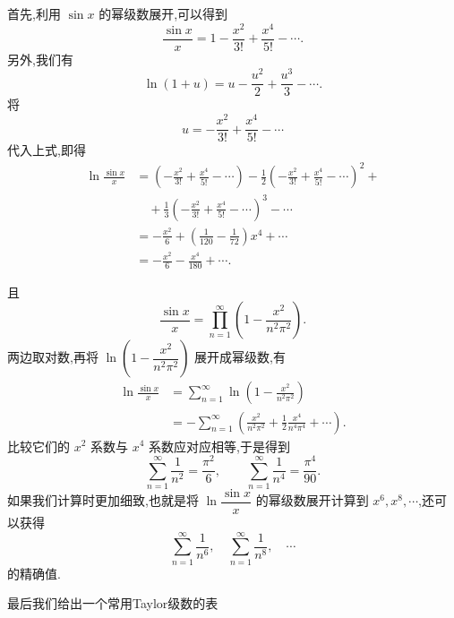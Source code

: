 \begin{solution}
	首先,利用 $\sin x$ 的幂级数展开,可以得到
	\[
	\frac{\sin x}{x}=1-\frac{x^2}{3!}+\frac{x^4}{5!}-\cdots .
	\]
	另外,我们有
	\[
	\ln(1+u)=u-\frac{u^2}{2}+\frac{u^3}{3}-\cdots .
	\]
	将
	\[
	u=-\frac{x^2}{3!}+\frac{x^4}{5!}-\cdots
	\]
	代入上式,即得
	\[
	\begin{aligned}
		\ln\frac{\sin x}{x}
		&=\left(-\frac{x^2}{3!}+\frac{x^4}{5!}-\cdots\right)
		-\frac{1}{2}\left(-\frac{x^2}{3!}+\frac{x^4}{5!}-\cdots\right)^2+\\
		&\quad+\frac{1}{3}\left(-\frac{x^2}{3!}+\frac{x^4}{5!}-\cdots\right)^3-\cdots\\
		&=-\frac{x^2}{6}+\left(\frac{1}{120}-\frac{1}{72}\right)x^4+\cdots\\
		&=-\frac{x^2}{6}-\frac{x^4}{180}+\cdots .
	\end{aligned}
	\]
	
且
	\[
	\frac{\sin x}{x}=\prod_{n=1}^{\infty}\left(1-\frac{x^2}{n^2\pi^2}\right).
	\]
	两边取对数,再将 $\ln\left(1-\dfrac{x^2}{n^2\pi^2}\right)$ 展开成幂级数,有
	\[
	\begin{aligned}
		\ln\frac{\sin x}{x}
		&=\sum_{n=1}^{\infty}\ln\left(1-\frac{x^2}{n^2\pi^2}\right)\\
		&=-\sum_{n=1}^{\infty}\left(\frac{x^2}{n^2\pi^2}+\frac{1}{2}\frac{x^4}{n^4\pi^4}+\cdots\right).
	\end{aligned}
	\]
	比较它们的 $x^2$ 系数与 $x^4$ 系数应对应相等,于是得到
	\[
	\sum_{n=1}^{\infty}\frac{1}{n^2}=\frac{\pi^2}{6},
	\qquad
	\sum_{n=1}^{\infty}\frac{1}{n^4}=\frac{\pi^4}{90}.
	\]
	如果我们计算时更加细致,也就是将 $\ln\dfrac{\sin x}{x}$ 的幂级数展开计算到 $x^6,x^8,\cdots$,还可以获得
	\[
	\sum_{n=1}^{\infty}\frac{1}{n^6},
	\quad
	\sum_{n=1}^{\infty}\frac{1}{n^8},
	\quad\cdots
	\]
	的精确值.
\end{solution}
最后我们给出一个常用Taylor级数的表


